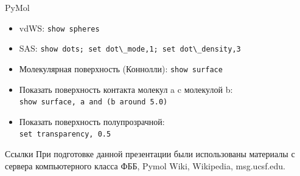 \documentclass{beamer}
\begin{document}
    \begin{frame}{PyMol}
        \begin{itemize}
        \item vdWS: \verb"show spheres"
        \item SAS: \verb"show dots; set dot\_mode,1; set dot\_density,3"
        \item Молекулярная поверхность (Коннолли): \verb"show surface"
        \item Показать поверхность контакта молекул a c молекулой b:\\
            \verb"show surface, a and (b around 5.0)"
        \item Показать поверхность полупрозрачной: \\
            \verb"set transparency, 0.5"
        \end{itemize}
    \end{frame}

    \begin{frame}{Ссылки}
        При подготовке данной презентации были использованы материалы с
        сервера компьютерного класса ФББ, Pymol Wiki, Wikipedia, msg.ucsf.edu.
    \end{frame}
\end{document}
